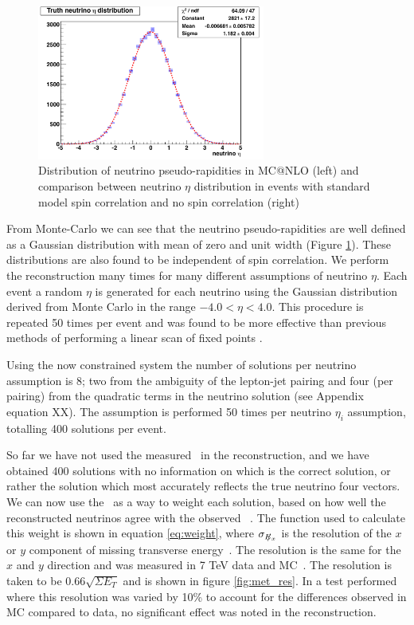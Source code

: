       \begin{figure}[h!]
      \begin{center}
     
      \includegraphics[width=75mm]{f/truth_neutrino_eta}
     
      \caption{Distribution of neutrino pseudo-rapidities in MC@NLO (left) and comparison between neutrino $\eta$ distribution in events with standard model spin correlation and no spin correlation (right)}
      \label{fig:nu_dist}
      \end{center}
      \end{figure}
     
      From Monte-Carlo we can see that the neutrino pseudo-rapidities are well defined as a Gaussian distribution with mean of zero and unit width (Figure \ref{fig:nu_dist}). These distributions are also found to be independent of spin correlation. We perform the reconstruction many times for many different assumptions of neutrino $\eta$. Each event a random $\eta$ is generated for each neutrino using the Gaussian distribution derived from Monte Carlo in the range $-4.0 < \eta < 4.0$. This procedure is repeated 50 times per event and was found to be more effective than previous methods of performing a linear scan of fixed points \cite{Meyer:2007zz}. 

Using the now constrained system the number of solutions per neutrino assumption is 8; two from the ambiguity of the lepton-jet pairing and four (per pairing) from the quadratic terms in the neutrino solution (see Appendix equation XX). The assumption is performed 50 times per neutrino $\eta_i$ assumption, totalling 400 solutions per event.
     
So far we have not used the measured \etmiss\ in the reconstruction, and we have obtained 400 solutions with no information on which is the correct solution, or rather the solution which most accurately reflects the true neutrino four vectors. We can now use the \etmiss\ as a way to weight each solution, based on how well the reconstructed neutrinos agree with the observed \etmiss\ . The function used to calculate this weight is shown in equation \ref{eq:weight}, where $\sigma_{E\kern-0.4em\slash_{x}}$ is the resolution of the $x$ or $y$ component of missing transverse energy~\cite{nuWtmass}. The resolution is the same for the $x$ and $y$ direction and was measured in 7 TeV data and MC~\cite{metres}. The resolution is taken to be $0.66 \sqrt{\Sigma E_T}$ and is shown in figure \ref{fig:met_res}. In a test performed where this resolution was varied by 10\% to account for the differences observed in MC compared to data, no significant effect was noted in the reconstruction.

